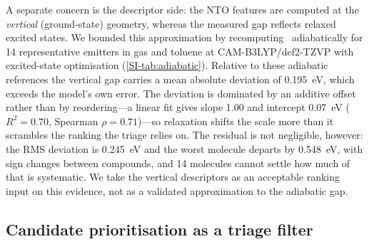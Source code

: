A separate concern is the descriptor side: the NTO features are computed at the
\emph{vertical} (ground-state) geometry, whereas the measured gap reflects relaxed
excited states. We bounded this approximation by recomputing \deltaest\ adiabatically
for \num{14} representative emitters in gas and toluene at CAM-B3LYP/def2-TZVP with
excited-state optimisation (\cref{SI-tab:adiabatic}). Relative to these adiabatic
references the vertical gap carries a mean absolute deviation of
\qty{0.195}{\electronvolt}, which exceeds the model's own error. The deviation is
dominated by an additive offset rather than by reordering---a linear fit gives slope
\num{1.00} and intercept \qty{0.07}{\electronvolt} ($R^2 = 0.70$, Spearman
$\rho = 0.71$)---so relaxation shifts the scale more than it scrambles the ranking the
triage relies on. The residual is not negligible, however: the RMS deviation is
\qty{0.245}{\electronvolt} and the worst molecule departs by \qty{0.548}{\electronvolt},
with sign changes between compounds, and \num{14} molecules cannot settle how much of
that is systematic. We take the vertical descriptors as an acceptable ranking input on
this evidence, not as a validated approximation to the adiabatic gap.

\subsection{Candidate prioritisation as a triage filter}\label{subsec:candidates}

